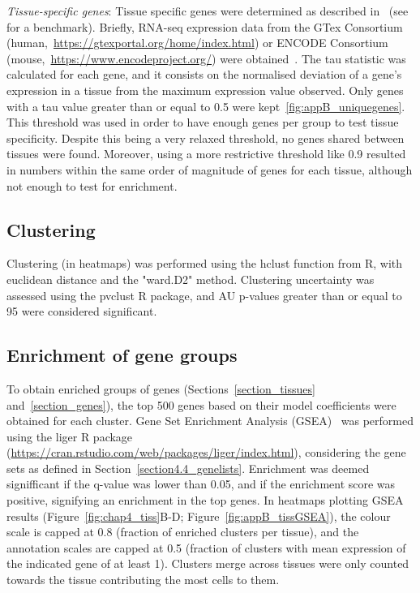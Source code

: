 \textit{Tissue-specific genes}: Tissue specific genes were determined as described in~\citep{yanai_genome-wide_2005} (see~\citep{kryuchkova-mostacci_benchmark_2017} for a benchmark). Briefly, RNA-seq expression data from the GTex Consortium (human,~\url{https://gtexportal.org/home/index.html}) or ENCODE Consortium (mouse,~\url{https://www.encodeproject.org/}) were obtained~\citep{consortium_genotype-tissue_2015,dunham_integrated_2012}. The tau statistic was calculated for each gene, and it consists on the normalised deviation of a gene's expression in a tissue from the maximum expression value observed. Only genes with a tau value greater than or equal to 0.5 were kept~\ref{fig:appB_uniquegenes}. This threshold was used in order to have enough genes per group to test tissue specificity. Despite this being a very relaxed threshold, no genes shared between tissues were found. Moreover, using a more restrictive threshold like 0.9 resulted in numbers within the same order of magnitude of genes for each tissue, although not enough to test for enrichment.


\subsection{Clustering}
\label{section4.4_clust}
Clustering (in heatmaps) was performed using the hclust function from R, with euclidean distance and the "ward.D2" method. Clustering uncertainty was assessed using the pvclust R package, and AU p-values greater than or equal to 95 were considered significant.


\subsection{Enrichment of gene groups}
\label{section4.4_enr}
To obtain enriched groups of genes (Sections~\ref{section_tissues} and~\ref{section_genes}), the top 500 genes based on their model coefficients were obtained for each cluster. Gene Set Enrichment Analysis (GSEA)~\citep{subramanian_gene_2005} was performed using the liger R package (\url{https://cran.rstudio.com/web/packages/liger/index.html}), considering the gene sets as defined in Section~\ref{section4.4_genelists}. Enrichment was deemed signifficant if the q-value was lower than 0.05, and if the enrichment score was positive, signifying an enrichment in the top genes. In heatmaps plotting GSEA results (Figure~\ref{fig:chap4_tiss}B-D; Figure~\ref{fig:appB_tissGSEA}), the colour scale is capped at 0.8 (fraction of enriched clusters per tissue), and the annotation scales are capped at 0.5 (fraction of clusters with mean expression of the indicated gene of at least 1). Clusters merge across tissues were only counted towards the tissue contributing the most cells to them.


